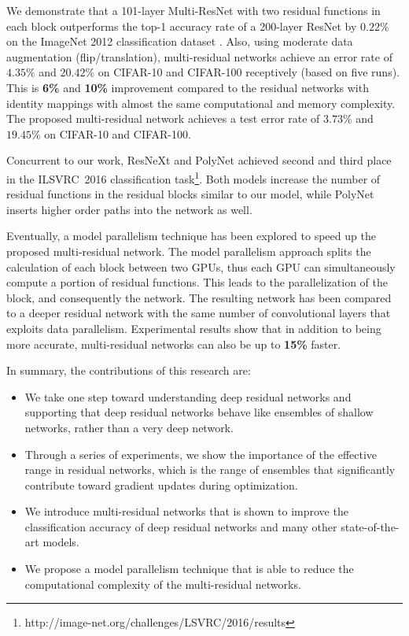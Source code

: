 \documentclass[journal]{IEEEtran}
\begin{document}
We demonstrate that a 101-layer Multi-ResNet with two residual functions in each block outperforms the top-1 accuracy rate of a 200-layer ResNet by $0.22\%$ on the ImageNet 2012 classification dataset \cite{ILSVRC15}. Also, using moderate data augmentation (flip/translation), multi-residual networks achieve an error rate of $4.35\%$ and $20.42\%$ on CIFAR-10 and CIFAR-100 receptively (based on five runs). This is \textbf{6\%} and \textbf{10\%} improvement compared to the residual networks with identity mappings \cite{he2016identity} with almost the same computational and memory complexity. The proposed multi-residual network achieves a test error rate of $3.73\%$ and $19.45\%$ on CIFAR-10 and CIFAR-100. 

Concurrent to our work, ResNeXt \cite{xie2016aggregated} and PolyNet \cite{zhang2016polynet} achieved second and third place in the ILSVRC~2016 classification task\footnote{http://image-net.org/challenges/LSVRC/2016/results}. Both models increase the number of residual functions in the residual blocks similar to our model, while PolyNet inserts higher order paths into the network as well. 

Eventually, a model parallelism technique has been explored to speed up the proposed multi-residual network. The model parallelism approach splits the calculation of each block between two GPUs, thus each GPU can simultaneously compute a portion of residual functions. This leads to the parallelization of the block, and consequently the network. The resulting network has been compared to a deeper residual network with the same number of convolutional layers that exploits data parallelism. Experimental results show that in addition to being more accurate, multi-residual networks can also be up to \textbf{15\%} faster.



In summary, the contributions of this research are:
\begin{itemize}
\item We take one step toward understanding deep residual networks and supporting that deep residual networks behave like ensembles of shallow networks, rather than a very deep network.

\item Through a series of experiments, we show the importance of the effective range in residual networks, which is the range of ensembles that significantly contribute toward gradient updates during optimization.

\item We introduce multi-residual networks that is shown to improve the classification accuracy of deep residual networks and many other state-of-the-art models.

\item We propose a model parallelism technique that is able to reduce the computational complexity of the multi-residual networks.

\end{itemize}
\end{document}

